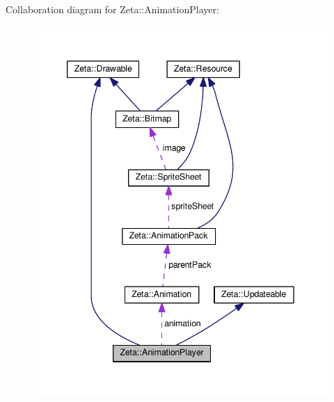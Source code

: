 Collaboration diagram for Zeta\+:\+:Animation\+Player\+:
\nopagebreak
\begin{figure}[H]
\begin{center}
\leavevmode
\includegraphics[width=342pt]{classZeta_1_1AnimationPlayer__coll__graph}
\end{center}
\end{figure}
